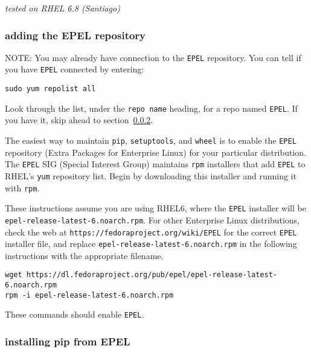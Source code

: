 \textit{tested on RHEL 6.8 (Santiago)}

\subsubsection{adding the EPEL repository}

NOTE: You may already have connection to the \verb|EPEL| repository.
You can tell if you have \verb|EPEL| connected by entering:
\begin{lstlisting}
sudo yum repolist all
\end{lstlisting}
Look through the list, 
under the \verb|repo name| heading,
for a repo named \verb|EPEL|.
If you have it, skip ahead to section~\ref{subsubsec:pip_from_epel}.

The easiest way to maintain \verb|pip|, \verb|setuptools|, and \verb|wheel|
is to enable the \verb|EPEL| repository (Extra Packages for Enterprise Linux)
for your particular distribution.
The \verb|EPEL| SIG (Special Interest Group) 
maintains \verb|rpm| installers that add \verb|EPEL| 
to RHEL's \verb|yum| repository list.
Begin by downloading this installer
and running it with \verb|rpm|.

These instructions assume you are using RHEL6,
where the \verb|EPEL| installer will be 
\verb|epel-release-latest-6.noarch.rpm|.
For other Enterprise Linux distributions,
check the web at \verb|https://fedoraproject.org/wiki/EPEL|
for the correct \verb|EPEL| installer file,
and replace \verb|epel-release-latest-6.noarch.rpm|
in the following instructions with the appropriate filename.
\begin{lstlisting}
wget https://dl.fedoraproject.org/pub/epel/epel-release-latest-6.noarch.rpm
rpm -i epel-release-latest-6.noarch.rpm  
\end{lstlisting}
These commands should enable \verb|EPEL|.


\subsubsection{installing pip from EPEL}
\label{subsubsec:pip_from_epel}

